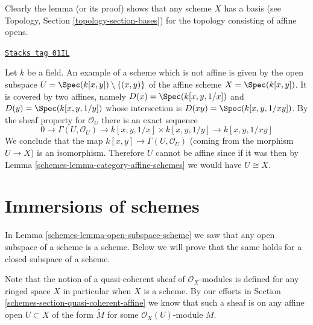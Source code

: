 Clearly the lemma (or its proof) shows that any scheme
$X$ has a basis (see Topology, Section \ref{topology-section-bases})
for the topology consisting of affine opens.

\begin{example}
\label{schemes-example-not-affine}
\href{https://stacks.math.columbia.edu/tag/01IL}{\texttt{Stacks tag 01IL}}

Let $k$ be a field.
An example of a scheme which is not affine is
given by the open subspace
$U = \Spec(k[x, y]) \setminus \{ (x, y)\}$
of the affine scheme $X =\Spec(k[x, y])$.
It is covered by two affines, namely $D(x) = \Spec(k[x, y, 1/x])$
and $D(y) = \Spec(k[x, y, 1/y])$ whose intersection is
$D(xy) = \Spec(k[x, y, 1/xy])$. By the sheaf property
for $\mathcal{O}_U$ there is an exact sequence
$$
0 \to
\Gamma(U, \mathcal{O}_U) \to
k[x, y, 1/x] \times k[x, y, 1/y] \to
k[x, y, 1/xy]
$$
We conclude that the map $k[x, y] \to \Gamma(U, \mathcal{O}_U)$
(coming from the morphism $U \to X$) is an isomorphism.
Therefore $U$ cannot be affine since if it was then by
Lemma \ref{schemes-lemma-category-affine-schemes} we would have $U \cong X$.
\end{example}

\section{Immersions of schemes}
\label{schemes-section-immersions}
In Lemma \ref{schemes-lemma-open-subspace-scheme} we saw that any open subspace
of a scheme is a scheme. Below we will prove that the same holds for
a closed subspace of a scheme.

\medskip\noindent
Note that the notion of a quasi-coherent sheaf of $\mathcal{O}_X$-modules
is defined for any ringed space $X$ in particular when $X$ is a scheme.
By our efforts in Section \ref{schemes-section-quasi-coherent-affine} we
know that such a sheaf is on any affine open $U \subset X$
of the form $\widetilde M$ for some $\mathcal{O}_X(U)$-module $M$.

